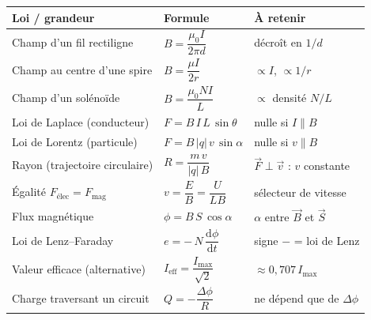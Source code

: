 \documentclass[11pt,a4paper]{article}
\newcommand{\Bvec}{\vec{B}}
\newcommand{\Fvec}{\vec{F}}
\newcommand{\vvec}{\vec{v}}
\newcommand{\Svec}{\vec{S}}
\newcommand{\dd}{\mathrm{d}}
\begin{document}
\begin{center}
\renewcommand{\arraystretch}{1.5}
\begin{tabular}{>{\raggedright\arraybackslash}p{4.5cm} >{\centering\arraybackslash}p{5.4cm} >{\raggedright\arraybackslash}p{4.3cm}}
\rowcolor{primary!18}
\textbf{Loi / grandeur} & \textbf{Formule} & \textbf{À retenir} \\
\midrule
Champ d'un fil rectiligne & $B = \dfrac{\mu_0 I}{2\pi d}$ & décroît en $1/d$ \\
Champ au centre d'une spire & $B = \dfrac{\mu I}{2r}$ & $\propto I$, $\propto 1/r$ \\
Champ d'un solénoïde & $B = \dfrac{\mu_0 N I}{L}$ & $\propto$ densité $N/L$ \\
Loi de Laplace (conducteur) & $F = B\,I\,L\,\sin\theta$ & nulle si $I\parallel B$ \\
Loi de Lorentz (particule) & $F = B\,|q|\,v\,\sin\alpha$ & nulle si $v\parallel B$ \\
Rayon (trajectoire circulaire) & $R = \dfrac{m\,v}{|q|\,B}$ & $\Fvec\perp\vvec$ : $v$ constante \\
Égalité $F_{\text{élec}}=F_{\text{mag}}$ & $v = \dfrac{E}{B} = \dfrac{U}{L B}$ & sélecteur de vitesse \\
Flux magnétique & $\phi = B\,S\,\cos\alpha$ & $\alpha$ entre $\Bvec$ et $\Svec$ \\
Loi de Lenz--Faraday & $e = -\,N\,\dfrac{\dd\phi}{\dd t}$ & signe $-$ = loi de Lenz \\
Valeur efficace (alternative) & $I_{\text{eff}}=\dfrac{I_{\max}}{\sqrt 2}$ & $\approx 0{,}707\,I_{\max}$ \\
Charge traversant un circuit & $Q = -\dfrac{\Delta\phi}{R}$ & ne dépend que de $\Delta\phi$ \\
\bottomrule
\end{tabular}
\end{center}
\end{document}
